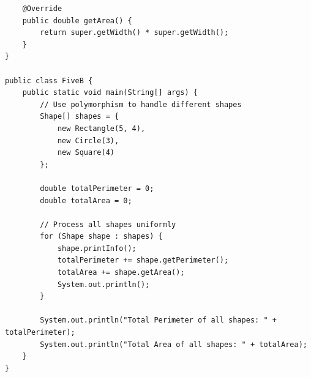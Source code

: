\documentclass[12pt,a4paper]{article}
\begin{document}
\begin{lstlisting}
    @Override
    public double getArea() {
        return super.getWidth() * super.getWidth();
    }
}

public class FiveB {
    public static void main(String[] args) {
        // Use polymorphism to handle different shapes
        Shape[] shapes = {
            new Rectangle(5, 4),
            new Circle(3),
            new Square(4)
        };

        double totalPerimeter = 0;
        double totalArea = 0;

        // Process all shapes uniformly
        for (Shape shape : shapes) {
            shape.printInfo();
            totalPerimeter += shape.getPerimeter();
            totalArea += shape.getArea();
            System.out.println();
        }

        System.out.println("Total Perimeter of all shapes: " + totalPerimeter);
        System.out.println("Total Area of all shapes: " + totalArea);
    }
}

\end{lstlisting}
\end{document}
